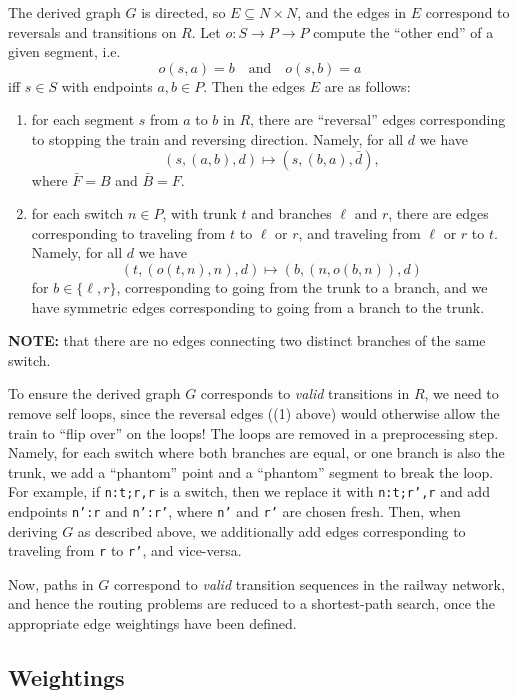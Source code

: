 \documentclass[11pt]{article}
\begin{document}
The derived graph $G$ is directed, so $E \subseteq N \times N$, and
the edges in $E$ correspond to reversals and transitions on $R$.  Let
$o : S \to P \to P$ compute the ``other end'' of a given segment,
i.e.
\[
  o(s,a) = b \quad \text{and} \quad o(s,b) = a
\] iff $s \in S$ with endpoints $a,b \in P$.  Then the edges $E$ are
as follows:

\begin{enumerate}
\item for each segment $s$ from $a$ to $b$ in $R$, there are ``reversal''
   edges corresponding to stopping the train and reversing direction.
   Namely, for all $d$ we have
   \[
   (s,(a,b),d) \mapsto (s,(b,a),\bar d),
   \]
   where $\bar F = B$ and $\bar B = F$.
\item for each switch $n \in P$, with trunk $t$ and branches $\ell$ and
   $r$, there are edges corresponding to traveling from $t$ to $\ell$
   or $r$, and traveling from $\ell$ or $r$ to $t$.  Namely, for all $d$ we have
   \[
   (t,(o(t,n),n),d) \mapsto (b,(n,o(b,n)),d)
   \]
   for $b \in \{\ell,r\}$, corresponding to going from the trunk to a
   branch, and we have symmetric edges corresponding to going from a
   branch to the trunk.
\end{enumerate}
\textbf{NOTE:} that there are no edges connecting two distinct branches of the
same switch.

To ensure the derived graph $G$ corresponds to \emph{valid} transitions in
$R$, we need to remove self loops, since the reversal edges ((1)
above) would otherwise allow the train to ``flip over'' on the loops!
The loops are removed in a preprocessing step. Namely, for each switch
where both branches are equal, or one branch is also the trunk, we add
a ``phantom'' point and a ``phantom'' segment to break the loop. For
example, if \texttt{n:t;r,r} is a switch, then we replace it with \texttt{n:t;r',r}
and add endpoints \texttt{n':r} and \texttt{n':r'}, where \texttt{n'} and
\texttt{r'} are chosen fresh.  Then, when deriving $G$ as described
above, we additionally add edges corresponding to traveling from \texttt{r}
to \texttt{r'}, and vice-versa.

Now, paths in $G$ correspond to \emph{valid} transition sequences in the
railway network, and hence the routing problems are reduced to a
shortest-path search, once the appropriate edge weightings have been
defined.

\subsection{Weightings}
\label{sec-2.2}
\end{document}
